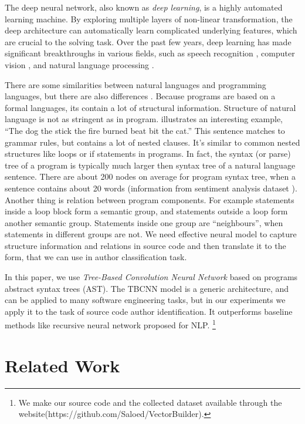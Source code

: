 \documentclass[11pt,technote]{IEEEtran}
\begin{document}
The deep neural network, also known as \textit{deep learning}, is a highly automated
learning machine. By exploring multiple layers of non-linear transformation, the deep
architecture can automatically learn complicated underlying features, which are
crucial to the solving task. Over the past few years, deep learning has made
significant breakthroughs in various fields, such as speech recognition \cite{speech},
computer vision \cite{imagenet}, and natural language processing \cite{unified}.

There are some similarities between natural languages and programming languages, but
there are also differences \cite{PLNL}. 
Because programs are based on a formal languages, its contain a lot of structural information.
Structure of natural language is not as stringent as in program. \cite{instinct} illustrates an interesting example, ``The dog the stick the fire
burned beat bit the cat.'' This sentence matches to grammar rules, but contains a lot of nested
clauses. It's similar to common nested structures like loops or if statements in programs. 
In fact, the syntax (or parse) tree of a program is typically much larger then syntax tree of a 
 natural language sentence. There are about 200 nodes on average for program syntax tree, when a sentence
 contains about 20 words (information from sentiment analysis dataset \cite{RNN}). 
 Another thing is relation between program components. For example statements inside a loop block
 form a semantic group, and statements outside a loop form another semantic group. Statements inside one group
 are ``neighbours'', when statements in different groups are not. We need effective neural model to capture 
 structure information and relations in source code and then translate it to the form, that we can use in
 author classification task.
 
 In this paper, we use \textit{Tree-Based Convolution Neural Network} 
based on  programs abstract syntax trees (AST).  The TBCNN model is a generic architecture,
and can be applied to many software engineering tasks, but in our experiments we apply it to the task
of source code author identification. It outperforms baseline methods like recursive neural
network \cite{RAE} proposed for NLP. 
\footnote{We make our source code and the collected dataset available
through the website(https://github.com/Saloed/VectorBuilder).}
 
   


\section{Related Work}
\end{document}
